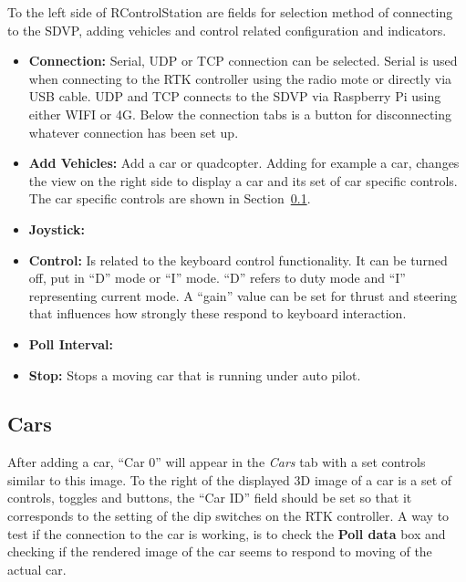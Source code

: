 \documentclass[12pt]{article} %
\begin{document}
\begin{minipage}{0.2\textwidth}
\end{minipage}
\begin{minipage}{0.7\textwidth}
  To the left side of RControlStation are fields for selection method of connecting to the
  SDVP, adding vehicles and control related configuration and indicators.  
  \begin{itemize}
  \item {\bf Connection:} Serial, UDP or TCP connection can be
    selected. Serial is used when connecting to the RTK controller
    using the radio mote or directly via USB cable. UDP and TCP
    connects to the SDVP via Raspberry Pi using either WIFI or 4G.
    Below the connection tabs is a button for disconnecting whatever
    connection has been set up. 
  \item {\bf Add Vehicles:} Add a car or quadcopter. Adding for
    example a car, changes the view on the right side to display a car
    and its set of car specific controls. The car specific controls are
    shown in Section~\ref{sec:cars}. %
  \item {\bf Joystick:} 
  \item {\bf Control:} Is related to the keyboard control
    functionality. It can be turned off, put in ``D'' mode or ``I''
    mode. ``D'' refers to duty mode and ``I'' representing current
    mode.  A ``gain'' value can be set for thrust and steering that
    influences how strongly these respond to keyboard interaction.
  \item {\bf Poll Interval:}
  \item {\bf Stop:} Stops a moving car that is running under auto pilot.
  \end{itemize} 
\end{minipage}


\subsection{Cars}
\label{sec:cars}


  After adding a car, ``Car 0'' will appear in the {\em Cars} tab with
  a set controls similar to this image.  To the right of the displayed
  3D image of a car is a set of controls, toggles and buttons, the
  ``Car ID'' field should be set so that it corresponds to the setting
  of the dip switches on the RTK controller. A way to test if the
  connection to the car is working, is to check the {\bf Poll data}
  box and checking if the rendered image of the car seems to respond
  to moving of the actual car.
  
\end{document}
